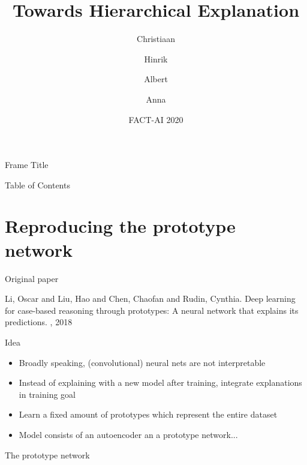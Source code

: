 \documentclass{beamer}[169]
\title{Towards Hierarchical Explanation}
\author{Christiaan \and Hinrik \and Albert \and Anna}
\date{FACT-AI 2020}
\begin{document}
\frame{\titlepage}

\begin{frame}{Frame Title}
\end{frame}


\begin{frame}{Table of Contents}
\tableofcontents
\end{frame}



\section{Reproducing the prototype network}
\begin{frame}{Original paper}
    \begin{thebibliography}{99}
        Li, Oscar and Liu, Hao and Chen, Chaofan and Rudin, Cynthia.
        \newblock Deep learning for case-based reasoning through prototypes: A neural network that explains its predictions.
        , 2018
    \end{thebibliography}
\end{frame}

\begin{frame}{Idea}
\begin{itemize}
    \item Broadly speaking, (convolutional) neural nets are not interpretable
    \item Instead of explaining with a new model after training, integrate explanations in training goal
    \item Learn a fixed amount of \alert{prototypes} which represent the entire dataset
    \item Model consists of an autoencoder an a prototype network...
\end{itemize}
\end{frame}

\begin{frame}{The prototype network}
\begin{figure}
    
    \end{figure}
\end{frame}
\end{document}
